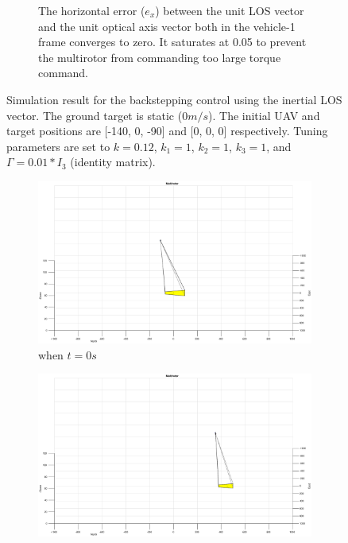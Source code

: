 \begin{figure}
\begin{subfigure}[b]{0.8\linewidth}
		\caption{The horizontal error ($e_x$) between the unit LOS vector and the unit optical axis vector both in the vehicle-1 frame converges to zero. It saturates at 0.05 to prevent the multirotor from commanding too large torque command.}
	\end{subfigure}	
	\caption{Simulation result for the backstepping control using the inertial LOS vector. The ground target is static ($0m/s$). The initial UAV and target positions are [-140, 0, -90] and [0, 0, 0] respectively. Tuning parameters are set to $k=0.12$, $k_1=1$, $k_2=1$, $k_3=1$, and $\Gamma=0.01*I_3$ (identity matrix).}
	\label{inertial_0mps}
\end{figure}

\begin{figure}
	\centering
	\begin{subfigure}[b]{0.32\linewidth}
		\includegraphics[width=\textwidth]{images/chapter4/inertial_UAV_5mps}
		\caption{when $t=0s$}
	\end{subfigure}
	\begin{subfigure}[b]{0.32\linewidth}
		\includegraphics[width=\textwidth]{images/chapter4/inertial_UAV_5mps_90s}

\end{subfigure}
\end{figure}
